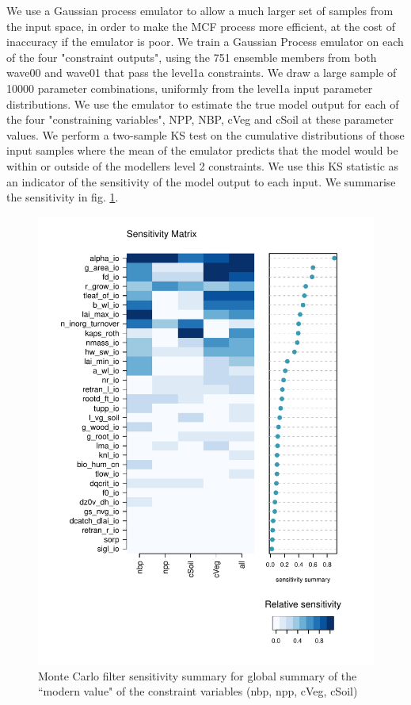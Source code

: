 \documentclass[gmd, manuscript]{copernicus}
\begin{document}
We use a Gaussian process emulator to allow a much larger set of samples from the input space, in order to make the MCF process more efficient, at the cost of inaccuracy if the emulator is poor. We train a Gaussian Process emulator on each of the four "constraint outputs", using the 751 ensemble members from both wave00 and wave01 that pass the level1a constraints. We draw a large sample of 10000 parameter combinations, uniformly from the level1a input parameter distributions. We use the emulator to estimate the true model output for each of the four "constraining variables", NPP, NBP, cVeg and cSoil at these parameter values. We perform a two-sample KS test on the cumulative distributions of those input samples where the mean of the emulator predicts that the model would be within or outside of the modellers level 2 constraints. We use this KS statistic as an indicator of the sensitivity of the model output to each input. We summarise the sensitivity in fig. \ref{fig:MCF_sensmat_Yconst_level1a_wave01}.

\begin{figure}[t]
\includegraphics[width=12cm]{./figs/MCF_sensmat_Yconst_level1a_wave01}
\caption{Monte Carlo filter sensitivity summary for global summary of the ``modern value" of the constraint variables (nbp, npp, cVeg, cSoil)}
\label{fig:MCF_sensmat_Yconst_level1a_wave01}
\end{figure}
\end{document}
